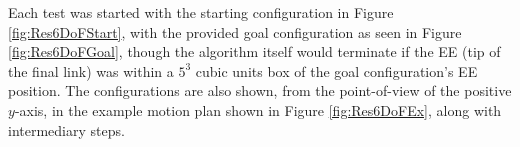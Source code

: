 
Each test was started with the starting configuration in Figure \ref{fig:Res6DoFStart}, with the provided goal configuration as seen in Figure \ref{fig:Res6DoFGoal}, though the algorithm itself would terminate if the \gls{EE} (tip of the final link) was within a $5^3$ cubic units box of the goal configuration's \gls{EE} position. The configurations are also shown, from the point-of-view of the positive $y$-axis, in the example motion plan shown in Figure \ref{fig:Res6DoFEx}, along with intermediary steps.

